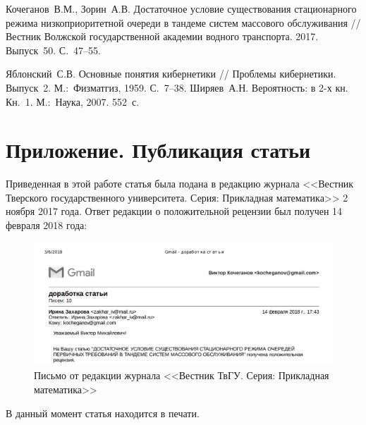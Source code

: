 \documentclass[12pt]{extarticle}
\theoremstyle{theorem}
\theoremstyle{remark}
\begin{document}
\begin{thebibliography}{99}
 Кочеганов~В.М., Зорин~А.В. Достаточное условие существования стационарного режима низкоприоритетной очереди в тандеме систем массового обслуживания // Вестник Волжской государственной академии водного транспорта. 2017. Выпуск~50. С.~47–55.

 Яблонский~С.В. Основные понятия кибернетики // Проблемы кибернетики. Выпуск~2. М.:~Физматгиз, 1959. С.~7–38.
 Ширяев~А.Н. Вероятность: в 2-х кн. Кн.~1. М.:~Наука, 2007. 552~с.


\end{thebibliography}
\newpage
\section{Приложение. Публикация статьи}
Приведенная в этой работе статья была подана в редакцию журнала <<Вестник Тверского государственного университета. Серия: Прикладная математика>> 2 ноября 2017 года. Ответ редакции о положительной рецензии был получен 14 февраля 2018 года:

\begin{figure}[h]
\includegraphics[scale=0.45]{Correspondence.png} 
\caption{Письмо от редакции журнала <<Вестник ТвГУ. Серия: Прикладная математика>>}
\end{figure}
В данный момент статья находится в печати.
\end{document}
